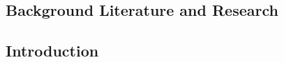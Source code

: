 \documentclass[12pt]{article} %
\begin{document}
\begin{flushleft}
\tableofcontents %
\listoffigures


\newpage %

\section{Background Literature and Research} %

\subsection{Introduction} %


\end{flushleft}
\end{document}

